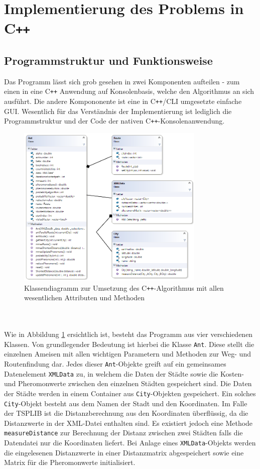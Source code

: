 \documentclass[doktyp=barbeit, sprache=german]{TUBAFarbeiten}
\begin{document}
\section{Implementierung des Problems in C\texttt{++}}
\label{sec:Implementierung}
\subsection{Programmstruktur und Funktionsweise}
Das Programm lässt sich grob gesehen in zwei Komponenten aufteilen - zum einen in eine C\texttt{++} Anwendung auf Konsolenbasis, welche den Algorithmus an sich ausführt. Die andere Kompononente ist eine in C\texttt{++}/CLI umgesetzte einfache GUI. Wesentlich für das Verständnis der Implementierung ist lediglich die Programmstruktur und der Code der nativen C\texttt{++}-Konsolenanwendung. 
\begin{figure}
\captionsetup{justification=centering}
  \centering
     \includegraphics[width=0.8\textwidth]{images/classdiagram.png}
  \caption{Klassendiagramm zur Umsetzung des C\texttt{++}-Algorithmus mit allen wesentlichen Attributen und Methoden}
  \label{img:classdiagram}
\end{figure}
\\\\Wie in Abbildung \ref{img:classdiagram} ersichtlich ist, besteht das Programm aus vier verschiedenen Klassen. Von grundlegender Bedeutung ist hierbei die Klasse \texttt{Ant}. Diese stellt die einzelnen Ameisen mit allen wichtigen Parametern und Methoden zur Weg- und Routenfindung dar. Jedes dieser \texttt{Ant}-Objekte greift auf ein gemeinsames Datenelement \texttt{XMLData} zu, in welchem die Daten der Städte sowie die Kosten- und Pheromonwerte zwischen den einzelnen Städten gespeichert sind. Die Daten der Städte werden in einem Container aus \texttt{City}-Objekten gespeichert. Ein solches \texttt{City}-Objekt besteht aus dem Namen der Stadt und den Koordinaten. Im Falle der TSPLIB ist die Distanzberechnung aus den Koordinaten überflüssig, da die Distanzwerte in der XML-Datei enthalten sind.   Es existiert jedoch eine Methode \texttt{measureDistance} zur Berechnung der Distanz zwischen zwei Städten falls die Datendatei nur die Koordinaten liefert. Bei Anlage eines \texttt{XMLData}-Objekts werden die eingelesenen Distanzwerte in einer Distanzmatrix abgespeichert sowie eine Matrix für die Pheromonwerte initialisiert.  
\end{document}
